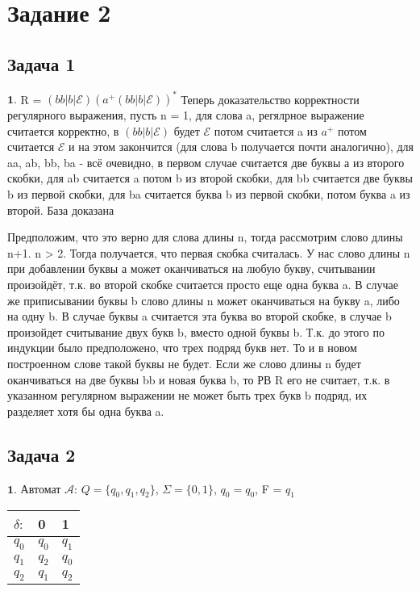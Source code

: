 \documentclass[a4paper,14pt]{article} %
\begin{document}

\section{Задание 2}
\subsection{Задача 1}

$\textbf{1.}$ R = $(bb|b|\mathcal{E})$$(a^{+}(bb|b|\mathcal{E}))^{*}$
Теперь доказательство корректности регулярного выражения, пусть n = 1, для слова a, регялрное выражение считается корректно, в $(bb|b|\mathcal{E})$ будет $\mathcal{E}$
потом считается a из $a^{+}$ потом считается $\mathcal{E}$ и на этом закончится (для слова b получается почти аналогично), для aa, ab, bb, ba - всё очевидно, в первом случае считается две буквы а из второго скобки, для ab считается a потом b из второй скобки, для bb считается две буквы b из первой скобки, для ba считается буква b из первой скобки, потом буква a из второй.
База доказана

Предположим, что это верно для слова длины n, тогда рассмотрим слово длины n+1.
n > 2. Тогда получается, что первая скобка считалась. У нас слово длины n при добавлении буквы а может оканчиваться на любую букву, считывании произойдёт, т.к. во второй скобке считается просто еще одна буква a.
В случае же приписывании буквы b слово длины n может оканчиваться на букву a, либо на одну b. В случае буквы a считается эта буква во второй скобке, в случае b произойдет считывание двух букв b, вместо одной буквы b.
Т.к. до этого по индукции было предположено, что трех подряд букв нет. То и в новом построенном слове такой буквы не будет. Если же слово длины n будет оканчиваться на две буквы bb и новая буква b, то РВ R его не считает, т.к. в указанном регулярном выражении не может быть трех букв b подряд, их разделяет хотя бы одна буква a.  

\subsection{Задача 2}
$\textbf{1.}$ Автомат $\mathcal{A}$: $Q = \{q_0, q_1, q_2\}$, $\Sigma = \{0, 1\}$, $q_0 = q_0$, F = $q_1$
\begin{tabular}{ | l | l | l | }
    \hline
    $\delta:$ & 0       & 1     \\ \hline
    $q_0$ & $q_0$   & $q_1$ \\
    $q_1$ & $q_2$   & $q_0$ \\
    $q_2$ & $q_1$   & $q_2$ \\
    \hline
    \end{tabular}
\end{document}
